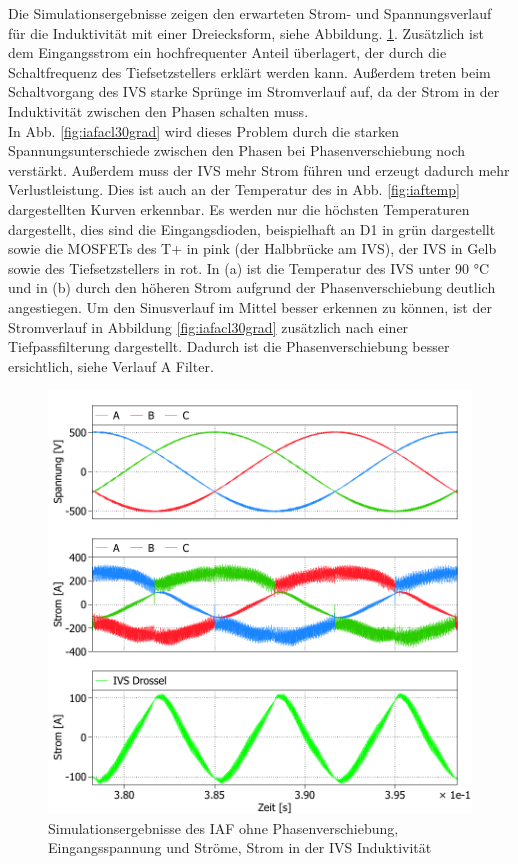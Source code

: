 Die Simulationsergebnisse zeigen den erwarteten Strom- und Spannungsverlauf für die Induktivität mit einer Dreiecksform, siehe Abbildung. \ref{fig:iafacl}. Zusätzlich ist dem Eingangsstrom ein hochfrequenter Anteil überlagert, der durch die Schaltfrequenz des Tiefsetzstellers erklärt werden kann. Außerdem treten beim Schaltvorgang des \gls{IVS} starke Sprünge im Stromverlauf auf, da der Strom in der Induktivität zwischen den Phasen schalten muss.\\
In Abb. \ref{fig:iafacl30grad} wird dieses Problem durch die starken Spannungsunterschiede zwischen den Phasen bei Phasenverschiebung noch verstärkt. Außerdem muss der \gls{IVS} mehr Strom führen und erzeugt dadurch mehr Verlustleistung. Dies ist auch an der Temperatur des in Abb. \ref{fig:iaftemp} dargestellten Kurven erkennbar. Es werden nur die höchsten Temperaturen dargestellt, dies sind die Eingangsdioden, beispielhaft an D1 in grün dargestellt sowie die \gls{MOSFET}s des T+ in pink (der Halbbrücke am \gls{IVS}), der \gls{IVS} in Gelb sowie des Tiefsetzstellers in rot. In (a) ist die Temperatur des IVS unter 90 °C und in (b) durch den höheren Strom aufgrund der Phasenverschiebung deutlich angestiegen. Um den Sinusverlauf im Mittel besser erkennen zu können, ist der Stromverlauf in Abbildung \ref{fig:iafacl30grad} zusätzlich nach einer Tiefpassfilterung dargestellt. Dadurch ist die Phasenverschiebung besser ersichtlich, siehe Verlauf A Filter.
\begin{figure}
	\centering
	\includegraphics[width=1\linewidth]{content/Grafiken/IAF_AC+L}
	\caption{Simulationsergebnisse des IAF ohne Phasenverschiebung, Eingangsspannung und Ströme, Strom in der IVS Induktivität }
	\label{fig:iafacl}
\end{figure}
